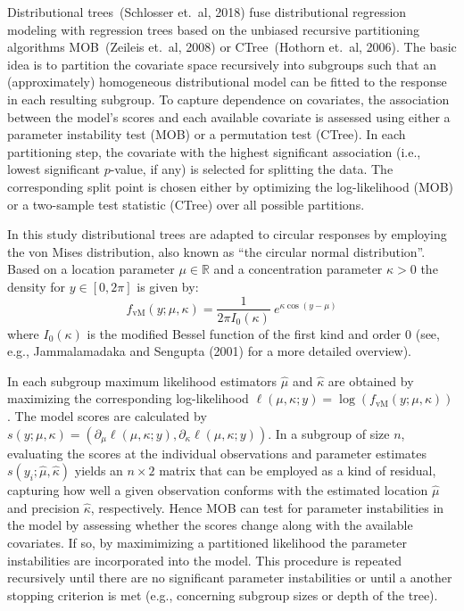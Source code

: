 \documentclass[twoside]{report}
\begin{document}
Distributional trees~(Schlosser et.~al, 2018) fuse distributional regression modeling with
regression trees based on the unbiased recursive partitioning algorithms MOB~(Zeileis et.~al, 2008)
or CTree~(Hothorn et.~al, 2006). The basic idea is to partition the covariate space recursively into subgroups 
such that an (approximately) homogeneous distributional model can be fitted to the response in each resulting subgroup.
To capture dependence on covariates, the association between the model's scores and each available
covariate is assessed using either a parameter instability test (MOB) or a permutation test (CTree).
In each partitioning step, the covariate with the highest significant association (i.e., lowest
significant $p$-value, if any) is selected for splitting the data. The corresponding split point
is chosen either by optimizing the log-likelihood (MOB) or a two-sample test statistic (CTree)
over all possible partitions.

In this study distributional trees are adapted to circular responses by employing the von Mises
distribution, also known as ``the circular normal distribution''. Based on a location parameter
$\mu \in \mathbb{R}$ and a concentration parameter $\kappa > 0$ the density for $y \in [0, 2 \pi]$
is given by:
\begin{equation}
  f_\mathrm{vM}(y; \mu, \kappa) = \frac{1}{2 \pi I_0(\kappa)}~e^{ \kappa \cos(y - \mu)}\label{equ:vm}
\end{equation}
where $I_0(\kappa)$ is the modified Bessel function of the first kind and order $0$
(see, e.g., Jammalamadaka and Sengupta (2001) for a more detailed overview).

In each subgroup maximum likelihood estimators $\hat \mu$ and $\hat \kappa$ are obtained
by maximizing the corresponding log-likelihood $\ell(\mu, \kappa; y) = \log(f_\mathrm{vM}(y;\mu, \kappa))$. 
The model scores are calculated by  $s(y; \mu, \kappa) = (\partial_{\mu} \ell(\mu, \kappa; y),
\partial_{\kappa} \ell(\mu, \kappa; y))$. In a subgroup of size $n$, evaluating the scores
at the individual observations and parameter estimates $s(y_i; \hat{\mu}, \hat{\kappa})$
yields an $n \times 2$ matrix that can be employed as a kind of residual, capturing how well
a given observation conforms with the estimated location $\hat{\mu}$ and precision $\hat{\kappa}$, respectively.
Hence MOB can test for parameter instabilities in the model by assessing whether the scores
change along with the available covariates. If so, by maximimizing a partitioned likelihood
the parameter instabilities are incorporated into the model. This procedure is repeated recursively
until there are no significant parameter instabilities or until a another stopping criterion
is met (e.g., concerning subgroup sizes or depth of the tree).
\end{document}
